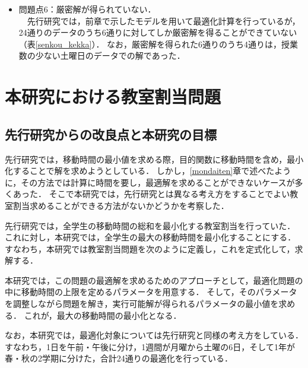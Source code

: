 \documentclass[12pt, a4paper, fleqn]{jreport}
\begin{document}
\begin{itemize}
\item 問題点6：厳密解が得られていない．\\
　先行研究では，前章で示したモデルを用いて最適化計算を行っているが，24通りのデータのうち6通りに対してしか厳密解を得ることができていない（表\ref{senkou_kekka}）．
なお，厳密解を得られた6通りのうち4通りは，授業数の少ない土曜日のデータでの解であった．
\end{itemize}
\vspace{3.0mm}

\chapter{本研究における教室割当問題}

\section{先行研究からの改良点と本研究の目標}
先行研究では，移動時間の最小値を求める際，目的関数に移動時間を含め，最小化することで解を求めようとしている．
しかし，\ref{mondaiten}章で述べたように，その方法では計算に時間を要し，最適解を求めることができないケースが多くあった．
そこで本研究では，先行研究とは異なる考え方をすることでよい教室割当求めることができる方法がないかどうかを考察した．

先行研究では，全学生の移動時間の総和を最小化する教室割当を行っていた．
これに対し，本研究では，全学生の最大の移動時間を最小化することにする．
すなわち，本研究では教室割当問題を次のように定義し，これを定式化して，求解する．\\
\begin{center}
\end{center}
\vspace{5.0mm}

本研究では，この問題の最適解を求めるためのアプローチとして，最適化問題の中に移動時間の上限を定めるパラメータを用意する．
そして，そのパラメータを調整しながら問題を解き，実行可能解が得られるパラメータの最小値を求める．
これが，最大の移動時間の最小化となる．

なお，本研究では，最適化対象については先行研究と同様の考え方をしている．
すなわち，1日を午前・午後に分け，1週間が月曜から土曜の6日，そして1年が春・秋の2学期に分けた，合計24通りの最適化を行っている．
\end{document}
